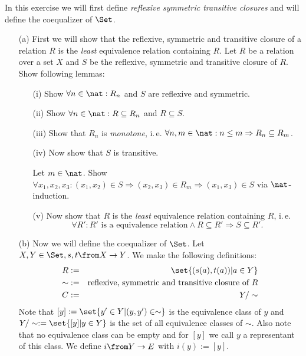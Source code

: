 \begin{exercise}
  In this exercise we will first define \emph{reflexive symmetric transitive closures} and will define the coequalizer of $\Set$.
  \begin{itemize}
    \item[(a)]First we will show that the reflexive, symmetric and transitive closure of a relation $R$ is the \emph{least} equivalence relation containing $R$.
      Let $R$ be a relation over a set $X$ and $S$ be the reflexive, symmetric and transitive closure of $R$. Show following lemmas:
      \begin{itemize}
        \item[(i)]Show $\forall n\in\nat: R_n$ and $S$ are reflexive and symmetric.
        \item[(ii)]Show $\forall n\in\nat: R \subseteq R_n$ and $R \subseteq S$.
        \item[(iii)]Show that $R_n$ is \emph{monotone}, i.\,e. $\forall n,m\in\nat: n\le m \Rightarrow R_n \subseteq R_m$.
        \item[(iv)]Now show that $S$ is transitive.
          \begin{hint}
            Let $m\in\nat$. Show $\forall x_1, x_2, x_3: (x_1, x_2) \in S \Rightarrow (x_2, x_3) \in R_m \Rightarrow (x_1, x_3) \in S$ via $\nat$-induction.
          \end{hint}
        \item[(v)]Now show that $R$ is the \emph{least} equivalence relation containing $R$, i.\,e.
          $$\forall R': \text{$R'$ is a equivalence relation} \land R \subseteq R' \Rightarrow S \subseteq R'.$$
      \end{itemize}
    \item[(b)]Now we will define the coequalizer of $\Set$.
      Let $X, Y \in \Set, s, t \from X \to Y$.
      We make the following definitions:
      \begin{alignat*}{2}
        R    &:=& \set{(s(a), t(a)) | a\in Y} \\
        \sim &:=& \text{reflexive, symmetric and transitive closure of $R$} \\
        C    &:=& Y / \sim
      \end{alignat*}
      Note that $[y] := \set{ y' \in Y | (y, y') \in \sim}$ is the equivalence class of $y$ and $Y / \sim := \set{ [y] | y \in Y}$ is the set of all equivalence classes of $\sim$.
      Also note that no equivalence class can be empty and for $[y]$ we call $y$ a representant of this class.
      We define $i \from Y \to E$ with $i(y) := [y]$.

\end{itemize}
\end{exercise}
